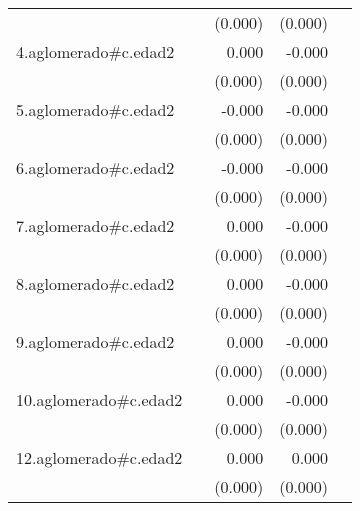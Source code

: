 {\begin{longtable}{l*{4}{D{.}{.}{-1}}}
            &                     &     (0.000)         &     (0.000)         &                     \\
\addlinespace
4.aglomerado#c.edad2&                     &       0.000         &      -0.000         &                     \\
            &                     &     (0.000)         &     (0.000)         &                     \\
\addlinespace
5.aglomerado#c.edad2&                     &      -0.000         &      -0.000\sym{**} &                     \\
            &                     &     (0.000)         &     (0.000)         &                     \\
\addlinespace
6.aglomerado#c.edad2&                     &      -0.000         &      -0.000\sym{*}  &                     \\
            &                     &     (0.000)         &     (0.000)         &                     \\
\addlinespace
7.aglomerado#c.edad2&                     &       0.000         &      -0.000         &                     \\
            &                     &     (0.000)         &     (0.000)         &                     \\
\addlinespace
8.aglomerado#c.edad2&                     &       0.000         &      -0.000         &                     \\
            &                     &     (0.000)         &     (0.000)         &                     \\
\addlinespace
9.aglomerado#c.edad2&                     &       0.000         &      -0.000         &                     \\
            &                     &     (0.000)         &     (0.000)         &                     \\
\addlinespace
10.aglomerado#c.edad2&                     &       0.000         &      -0.000         &                     \\
            &                     &     (0.000)         &     (0.000)         &                     \\
\addlinespace
12.aglomerado#c.edad2&                     &       0.000         &       0.000         &                     \\
            &                     &     (0.000)         &     (0.000)         &                     \\

\end{longtable}}
